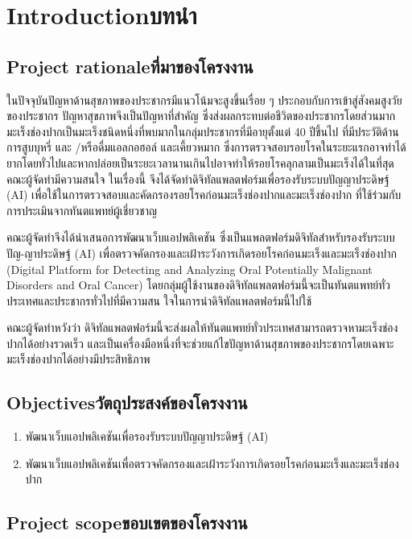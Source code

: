 \chapter{\ifenglish Introduction\else บทนำ\fi}

\section{\ifenglish Project rationale\else ที่มาของโครงงาน\fi}

ในปัจจุบันปัญหาด้านสุขภาพของประชากรมีแนวโน้มจะสูงขึ้นเรื่อย ๆ ประกอบกับการเข้าสู่สังคมสูงวัยของประชากร ปัญหาสุขภาพจึงเป็นปัญหาที่สำคัญ ซึ่งส่งผลกระทบต่อชีวิตของประชากรโดยส่วนมาก มะเร็งช่องปากเป็นมะเร็งชนิดหนึ่งที่พบมากในกลุ่มประชากรที่มีอายุตั้งแต่ 40 ปีขึ้นไป ที่มีประวัติด้านการสูบบุหรี่ และ
/หรือดื่มแอลกอฮอล์ และเคี้ยวหมาก ซึ่งการตรวจสอบรอยโรคในระยะแรกอาจทำได้ยากโดยทั่วไปและหากปล่อยเป็นระยะเวลานานเกินไปอาจทำให้รอยโรคลุกลามเป็นมะเร็งได้ในที่สุด คณะผู้จัดทำมีความสนใจ
ในเรื่องนี้ จึงได้จัดทำดิจิทัลแพลตฟอร์มเพื่อรองรับระบบปัญญาประดิษฐ์ (AI) เพื่อใช้ในการตรวจสอบและคัดกรองรอยโรคก่อนมะเร็งช่องปากและมะเร็งช่องปาก ที่ใช้ร่วมกับการประเมินจากทันตแพทย์ผู้เชี่ยวชาญ
    
คณะผู้จัดทำจึงได้นำเสนอการพัฒนาเว็บแอปพลิเคชัน ซึ่งเป็นแพลตฟอร์มดิจิทัลสำหรับรองรับระบบปัญ-ญาประดิษฐ์ (AI) เพื่อตรวจคัดกรองและเฝ้าระวังการเกิดรอยโรคก่อนมะเร็งและมะเร็งช่องปาก (Digital Platform for Detecting and Analyzing Oral Potentially Malignant Disorders and Oral Cancer) โดยกลุ่มผู้ใช้งานของดิจิทัลแพลตฟอร์มนี้จะเป็นทันตแพทย์ทั่วประเทศและประชากรทั่วไปที่มีความสน ใจในการนำดิจิทัลแพลตฟอร์มนี้ไปใช้
    
คณะผู้จัดทำหวังว่า ดิจิทัลแพลตฟอร์มนี้จะส่งผลให้ทันตแพทย์ทั่วประเทศสามารถตรวจหามะเร็งช่องปากได้อย่างรวดเร็ว และเป็นเครื่องมือหนึ่งที่จะช่วยแก้ไขปัญหาด้านสุขภาพของประชากรโดยเฉพาะมะเร็งช่องปากได้อย่างมีประสิทธิภาพ    


\section{\ifenglish Objectives\else วัตถุประสงค์ของโครงงาน\fi}
\begin{enumerate}
    \item พัฒนาเว็บแอปพลิเคชันเพื่อรองรับระบบปัญญาประดิษฐ์ (AI)
    \item พัฒนาเว็บแอปพลิเคชันเพื่อตรวจคัดกรองและเฝ้าระวังการเกิดรอยโรคก่อนมะเร็งและมะเร็งช่องปาก
\end{enumerate}

\section{\ifenglish Project scope\else ขอบเขตของโครงงาน\fi}

